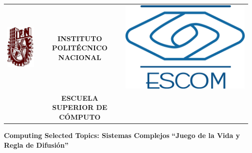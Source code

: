 \begin{titlepage}
    \begin{center}
    \begin{tabular}{r c l}
    \includegraphics[scale=.20]{images/ipn} & \textbf{INSTITUTO POLIT\'ECNICO NACIONAL} & \includegraphics[scale=.20]{images/escom}\\
    & \textbf{ESCUELA SUPERIOR DE C\'OMPUTO}
    \end{tabular}
    \end{center}


    \vspace{1.5cm}
    \begin{center}


    \textbf{Computing Selected Topics:  Sistemas Complejos} \linebreak
    \large \textbf{``Juego de la Vida y Regla de Difusión''} \linebreak


\end{center}
\end{titlepage}
